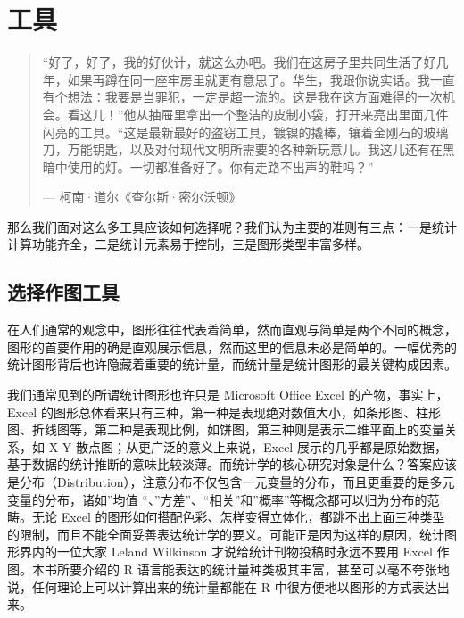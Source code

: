 \documentclass[
  b5paper,
  UTF8,twoside]{book}
\begin{document}
\chapter{工具}\label{cha:tools}

\begin{quote}
``好了，好了，我的好伙计，就这么办吧。我们在这房子里共同生活了好几年，如果再蹲在同一座牢房里就更有意思了。华生，我跟你说实话。我一直有个想法：我要是当罪犯，一定是超一流的。这是我在这方面难得的一次机会。看这儿！''他从抽屉里拿出一个整洁的皮制小袋，打开来亮出里面几件闪亮的工具。``这是最新最好的盗窃工具，镀镍的撬棒，镶着金刚石的玻璃刀，万能钥匙，以及对付现代文明所需要的各种新玩意儿。我这儿还有在黑暗中使用的灯。一切都准备好了。你有走路不出声的鞋吗？''

\hspace*{\fill} --- 柯南·道尔《查尔斯·密尔沃顿》
\end{quote}

那么我们面对这么多工具应该如何选择呢？我们认为主要的准则有三点：一是统计计算功能齐全，二是统计元素易于控制，三是图形类型丰富多样。

\section{选择作图工具}\label{ux9009ux62e9ux4f5cux56feux5de5ux5177}

在人们通常的观念中，图形往往代表着简单，然而直观与简单是两个不同的概念，图形的首要作用的确是直观展示信息，然而这里的信息未必是简单的。一幅优秀的统计图形背后也许隐藏着重要的统计量，而统计量是统计图形的最关键构成因素。

我们通常见到的所谓统计图形也许只是 Microsoft Office Excel 的产物，事实上，Excel 的图形总体看来只有三种，第一种是表现绝对数值大小，如条形图、柱形图、折线图等，第二种是表现比例，如饼图，第三种则是表示二维平面上的变量关系，如 X-Y 散点图；从更广泛的意义上来说，Excel 展示的几乎都是原始数据，基于数据的统计推断的意味比较淡薄。而统计学的核心研究对象是什么？答案应该是分布（Distribution），注意分布不仅包含一元变量的分布，而且更重要的是多元变量的分布，诸如''均值 ``、''方差''、``相关''和''概率''等概念都可以归为分布的范畴。无论 Excel 的图形如何搭配色彩、怎样变得立体化，都跳不出上面三种类型的限制，而且不能全面妥善表达统计学的要义。可能正是因为这样的原因，统计图形界内的一位大家 Leland Wilkinson 才说给统计刊物投稿时永远不要用 Excel 作图。本书所要介绍的 R 语言能表达的统计量种类极其丰富，甚至可以毫不夸张地说，任何理论上可以计算出来的统计量都能在 R 中很方便地以图形的方式表达出来。
\end{document}
